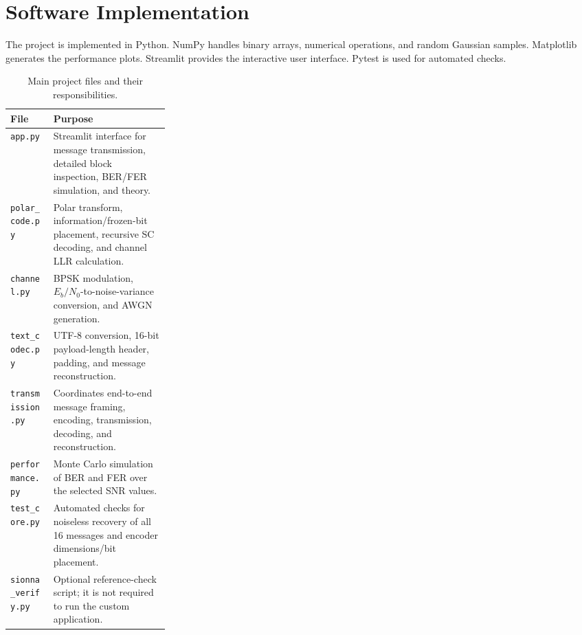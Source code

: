 \documentclass[12pt,a4paper]{article}
\newcommand{\code}[1]{\texttt{#1}}
\begin{document}
\section{Software Implementation}
The project is implemented in Python. NumPy handles binary arrays, numerical operations, and random Gaussian samples. Matplotlib generates the performance plots. Streamlit provides the interactive user interface. Pytest is used for automated checks.

\begin{table}[H]
\centering
\caption{Main project files and their responsibilities.}
\label{tab:files}
\small
\begin{tabularx}{\linewidth}{>{\raggedright\arraybackslash}p{0.27\linewidth}Y}
\toprule
\textbf{File} & \textbf{Purpose}\\
\midrule
\code{app.py} & Streamlit interface for message transmission, detailed block inspection, BER/FER simulation, and theory.\\
\code{polar\_code.py} & Polar transform, information/frozen-bit placement, recursive SC decoding, and channel LLR calculation.\\
\code{channel.py} & BPSK modulation, $E_b/N_0$-to-noise-variance conversion, and AWGN generation.\\
\code{text\_codec.py} & UTF-8 conversion, 16-bit payload-length header, padding, and message reconstruction.\\
\code{transmission.py} & Coordinates end-to-end message framing, encoding, transmission, decoding, and reconstruction.\\
\code{performance.py} & Monte Carlo simulation of BER and FER over the selected SNR values.\\
\code{test\_core.py} & Automated checks for noiseless recovery of all 16 messages and encoder dimensions/bit placement.\\
\code{sionna\_verify.py} & Optional reference-check script; it is not required to run the custom application.\\
\bottomrule
\end{tabularx}
\end{table}

\end{document}
